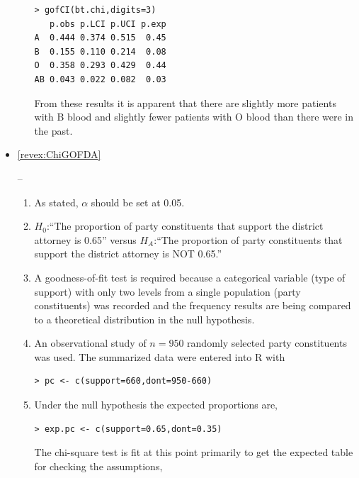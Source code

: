 \documentclass[10pt,openany]{book}\usepackage[]{graphicx}\usepackage[]{color}
\makeatletter
\newenvironment{kframe}{%
 \def\at@end@of@kframe{}%
 \ifinner\ifhmode%
  \def\at@end@of@kframe{\end{minipage}}%
  \begin{minipage}{\columnwidth}%
 \fi\fi%
 \def\FrameCommand##1{\hskip\@totalleftmargin \hskip-\fboxsep
 \colorbox{shadecolor}{##1}\hskip-\fboxsep
     \hskip-\linewidth \hskip-\@totalleftmargin \hskip\columnwidth}%
 \MakeFramed {\advance\hsize-\width
   \@totalleftmargin\z@ \linewidth\hsize
   \@setminipage}}%
 {\par\unskip\endMakeFramed%
 \at@end@of@kframe}
\newenvironment{knitrout}{}{} %
\makeatother
\begin{document}
\begin{itemize}
\begin{enumerate}
\begin{knitrout}
\begin{kframe}
\begin{verbatim}
> gofCI(bt.chi,digits=3)
   p.obs p.LCI p.UCI p.exp
A  0.444 0.374 0.515  0.45
B  0.155 0.110 0.214  0.08
O  0.358 0.293 0.429  0.44
AB 0.043 0.022 0.082  0.03
\end{verbatim}
\end{kframe}
\end{knitrout}
From these results it is apparent that there are slightly more patients with B blood and slightly fewer patients with O blood than there were in the past.
  \end{enumerate}
  \item \hypertarget{ans:ChiGOFDA}{\ref{revex:ChiGOFDA}} --
    \begin{enumerate}
      \item As stated, $\alpha$ should be set at 0.05.
      \item $H_{0}$:``The proportion of party constituents that support the district attorney is 0.65'' versus $H_{A}$:``The proportion of party constituents that support the district attorney is NOT 0.65.''
      \item A goodness-of-fit test is required because a categorical variable (type of support) with only two levels  from a single population (party constituents) was recorded and the frequency results are being compared to a theoretical distribution in the null hypothesis.
      \item An observational study of $n=950$ randomly selected party constituents was used.  The summarized data were entered into R with
\begin{knitrout}
\color{fgcolor}\begin{kframe}
\begin{verbatim}
> pc <- c(support=660,dont=950-660)
\end{verbatim}
\end{kframe}
\end{knitrout}
      \item Under the null hypothesis the expected proportions are,
\begin{knitrout}
\color{fgcolor}\begin{kframe}
\begin{verbatim}
> exp.pc <- c(support=0.65,dont=0.35)
\end{verbatim}
\end{kframe}
\end{knitrout}
The chi-square test is fit at this point primarily to get the expected table for checking the assumptions,

\end{enumerate}
\end{itemize}
\end{document}
